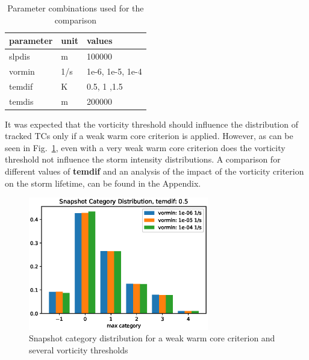 \begin{table}[ht]
	\centering
	\begin{tabular}{|l|l|l|}
		\hline
		\textbf{parameter} & \textbf{unit} & \textbf{values}  \\ \hline
		slpdis             & m             & 100000           \\
		vormin             & 1/s           & 1e-6, 1e-5, 1e-4 \\
		temdif             & K             & 0.5, 1 ,1.5      \\
		temdis             & m             & 200000           \\ \hline
	\end{tabular}
	\caption{Parameter combinations used for the comparison}
	\label{tab:vor-tem-comparison}
\end{table}
It was expected that the vorticity threshold should influence the distribution of tracked TCs only if a weak warm core criterion is applied. However, as can be seen in Fig.~\ref{fig:temdif-vormin-comp}, even with a very weak warm core criterion does the vorticity threshold not influence the storm intensity distributions. A comparison for different values of \textbf{temdif} and an analysis of the impact of the vorticity criterion on the storm lifetime, can be found in the Appendix.

\begin{figure}[ht]
	\centering
	\includegraphics[width=0.7\textwidth]{img/curr_category_vortem05.eps}
	\caption{Snapshot category distribution for a weak warm core criterion and several vorticity thresholds}
	\label{fig:temdif-vormin-comp}
\end{figure}

